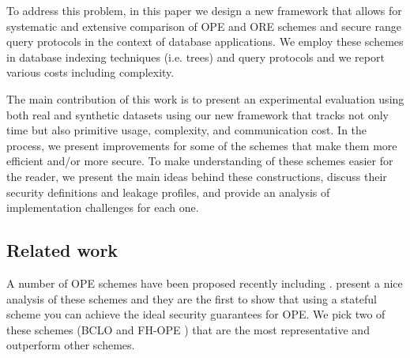 	To address this problem, in this paper we design a new framework that allows for systematic and extensive comparison of OPE and ORE schemes and secure range query protocols in the context of database applications.
	We employ these schemes in database indexing techniques (i.e. {\BPlus} trees) and query protocols and we report various costs including {\IO} complexity.

	The main contribution of this work is to present an experimental evaluation using both real and synthetic datasets using our new framework that tracks not only time but also primitive usage, {\IO} complexity, and communication cost.
	In the process, we present improvements for some of the schemes that make them more efficient and/or more secure.
	To make understanding of these schemes easier for the reader, we present the main ideas behind these constructions, discuss their security definitions and leakage profiles, and provide an analysis of implementation challenges for each one.

	\subsection{Related work}

		A number of OPE schemes have been proposed recently including \cite{ope-original, anti-tamper-dbs, bclo-ope, ope-leakage, ope-beyond-one-wayness, ope-early-fh-ope, ope-beyond-ideal-object, ope-mv-opes, fh-ope, ope-mv-popes, ope-multi-user, ope-note, ope-for-encrypted-dbs, ope-structure, ope-non-linear}. %
		\textcite{ope-ideal-security-protocol} present a nice analysis of these schemes and they are the first to show that using a stateful scheme you can achieve the ideal security guarantees for OPE\@.
		We pick two of these schemes (BCLO \cite{bclo-ope} and FH-OPE \cite{fh-ope}) that are the most representative and outperform other schemes.

